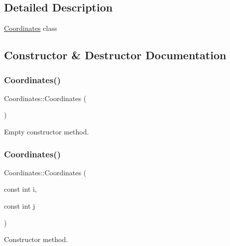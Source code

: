 \subsection{Detailed Description}
\mbox{\hyperlink{class_coordinates}{Coordinates}} class 

\subsection{Constructor \& Destructor Documentation}
\mbox{\label{class_coordinates_a89dd10af87d803fd51dfd9987f32e8cd}} 
\subsubsection{\texorpdfstring{Coordinates()}{Coordinates()}\hspace{0.1cm}{\footnotesize\ttfamily [1/2]}}
{\footnotesize\ttfamily Coordinates\+::\+Coordinates (\begin{DoxyParamCaption}{ }\end{DoxyParamCaption})\hspace{0.3cm}{\ttfamily [inline]}}



Empty constructor method. 

\mbox{\label{class_coordinates_ad95ddcb50cb3b0a6f6b432c32493ac2c}} 
\subsubsection{\texorpdfstring{Coordinates()}{Coordinates()}\hspace{0.1cm}{\footnotesize\ttfamily [2/2]}}
{\footnotesize\ttfamily Coordinates\+::\+Coordinates (\begin{DoxyParamCaption}\item[{const int}]{i,  }\item[{const int}]{j }\end{DoxyParamCaption})\hspace{0.3cm}{\ttfamily [inline]}}



Constructor method. 



